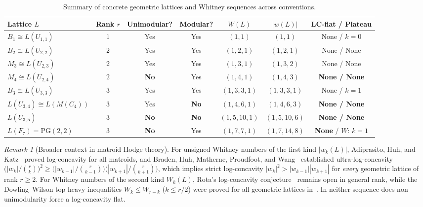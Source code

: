 \documentclass[11pt]{article}
\theoremstyle{definition}
\theoremstyle{remark}
\newtheorem{remark}[theorem]{Remark}
\begin{document}
\begin{table}[htbp]
\centering
\footnotesize
\setlength{\tabcolsep}{4.5pt}
\renewcommand{\arraystretch}{1.2}
\caption{Summary of concrete geometric lattices and Whitney sequences across conventions.}
\label{tab:summary}
\begin{tabular}{lcccccc}
\hline
Lattice $L$ & Rank $r$ & Unimodular? & Modular? & $W(L)$ & $|w(L)|$ & LC-flat / Plateau \\
\hline
$B_1 \cong L(U_{1,1})$ & $1$ & Yes & Yes & $(1, 1)$ & $(1, 1)$ & None / $k=0$ \\
$B_2 \cong L(U_{2,2})$ & $2$ & Yes & Yes & $(1, 2, 1)$ & $(1, 2, 1)$ & None / None \\
$M_3 \cong L(U_{2,3})$ & $2$ & Yes & Yes & $(1, 3, 1)$ & $(1, 3, 2)$ & None / None \\
$M_4 \cong L(U_{2,4})$ & $2$ & \textbf{No} & Yes & $(1, 4, 1)$ & $(1, 4, 3)$ & \textbf{None / None} \\
$B_3 \cong L(U_{3,3})$ & $3$ & Yes & Yes & $(1, 3, 3, 1)$ & $(1, 3, 3, 1)$ & None / $k=1$ \\
$L(U_{3,4}) \cong L(M(C_4))$ & $3$ & Yes & \textbf{No} & $(1, 4, 6, 1)$ & $(1, 4, 6, 3)$ & \textbf{None / None} \\
$L(U_{3,5})$ & $3$ & \textbf{No} & \textbf{No} & $(1, 5, 10, 1)$ & $(1, 5, 10, 6)$ & \textbf{None / None} \\
$L(F_7) = \mathrm{PG}(2,2)$ & $3$ & \textbf{No} & Yes & $(1, 7, 7, 1)$ & $(1, 7, 14, 8)$ & \textbf{None} / $W$: $k=1$ \\
\hline
\end{tabular}
\end{table}

\begin{remark}[Broader context in matroid Hodge theory]
For unsigned Whitney numbers of the first kind $|w_k(L)|$, Adiprasito, Huh, and Katz~\cite{AHK2018}
proved log-concavity for all matroids, and Braden, Huh, Matherne, Proudfoot, and
Wang~\cite{BHMPW2020} established ultra-log-concavity
$\bigl(|w_k|/\binom{r}{k}\bigr)^2 \ge \bigl(|w_{k-1}|/\binom{r}{k-1}\bigr)
\bigl(|w_{k+1}|/\binom{r}{k+1}\bigr)$, which implies strict log-concavity $|w_k|^2 >
|w_{k-1}||w_{k+1}|$ for \emph{every} geometric lattice of rank $r \ge 2$. For Whitney numbers of
the second kind $W_k(L)$, Rota's log-concavity conjecture~\cite{Rota1971} remains open in general
rank, while the Dowling--Wilson top-heavy inequalities $W_k \le W_{r-k}$ ($k \le r/2$) were proved
for all geometric lattices in~\cite{BHMPW2022}. In neither sequence does non-unimodularity force a
log-concavity flat.
\end{remark}
\end{document}
